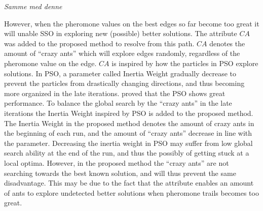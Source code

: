 \emph{\color{blue}Samme med denne}

However, when the pheromone values on the best edges so far become too great it will unable SSO in exploring new (possible) better solutions. The attribute $CA$ was added to the proposed method to resolve from this path. $CA$ denotes the amount of ``crazy ants'' which will explore edges randomly, regardless of the pheromone value on the edge. $CA$ is inspired by how the particles in PSO explore solutions. In PSO, a parameter called Inertia Weight gradually decrease to prevent the particles from drastically changing directions, and thus becoming more organized in the late iterations. \citet{kechagiopoulos14} proved that the PSO shows great performance. To balance the global search by the ``crazy ants'' in the late iterations the Inertia Weight inspired by PSO is added to the proposed method. The Inertia Weight in the proposed method denotes the amount of crazy ants in the beginning of each run, and the amount of ``crazy ants'' decrease in line with the parameter. Decreasing the inertia weight in PSO may suffer from low global search ability at the end of the run, and thus the possibly of getting stuck at a local optima. However, in the proposed method the ``crazy ants'' are not searching towards the best known solution, and will thus prevent the same disadvantage. This may be due to the fact that the attribute enables an amount of ants to explore undetected better solutions when pheromone trails becomes too great.
\newline 



